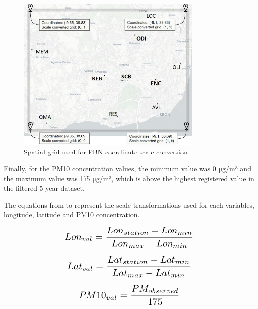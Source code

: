 \begin{figure}[ht]
\centering
\includegraphics[width=0.8\textwidth]{./Images/scale-converted-grid.jpg}
\caption{Spatial grid used for FBN coordinate scale conversion.}
\label{fig:scale-converted-grid}
\end{figure}

Finally, for the PM10 concentration values, the minimum value was 0 μg/m³ and the maximum value was 175 μg/m³, which is above the highest registered value in the filtered 5 year dataset.

The equations from  to  represent the scale transformations used for each variables, longitude, latitude and PM10 concentration.

\begin{equation} 
\label{longitude}
\scalebox{1.4}{$ Lon_{val} = \dfrac{Lon_{station}-Lon_{min}}{Lon_{max}-Lon_{min}} $}
\end{equation}

\begin{equation} 
\label{latitude}
\scalebox{1.4}{$Lat_{val} = \dfrac{Lat_{station}-Lat_{min}}{Lat_{max}-Lat_{min}}$}
\end{equation}

\begin{equation} 
\label{pm10-concentration}
\scalebox{1.4}{$PM10_{val} = \dfrac{PM_{observed}}{175}$}
\end{equation}


